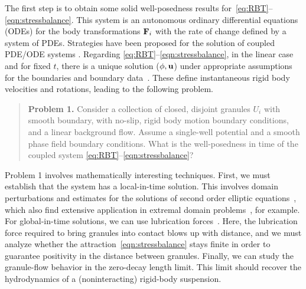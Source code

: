 The first step is to obtain some solid well-posedness results
for~\eqref{eq:RBT}--\eqref{eqn:stressbalance}.
This system is an
autonomous ordinary differential equations (ODEs) for the body transformations
$\mathbf{F}_i$ with the rate of change defined by a system of PDEs.
Strategies have been proposed for the solution of
coupled PDE/ODE systems 
\cite{Carichino2018EnergybasedOS,Quarteroni2016GeometricMM}.
Regarding \eqref{eq:RBT}--\eqref{eqn:stressbalance},
in the linear case and for fixed $t$, there is a unique
solution ($\phi, \mathbf{u}$) under appropriate assumptions for the boundaries
and boundary data~\cite{manasthesis, rac-gre2016, LAX}. These define
instantaneous rigid body velocities and rotations, leading to the
following problem.
\begin{quotation}
  \noindent
  \textbf{Problem 1.} 
  Consider a collection of closed, disjoint granules $U_i$ with smooth
  boundary, with no-slip, rigid body motion boundary conditions, and a
  linear background flow. Assume a single-well potential and a smooth
  phase field boundary conditions. What is the well-posedness in time of
  the coupled system \eqref{eq:RBT}--\eqref{eqn:stressbalance}?
\end{quotation}
Problem 1 involves mathematically interesting techniques. First, we must
establish that the system has a local-in-time solution. This involves
domain perturbations and estimates for the solutions of second order
elliptic equations~\cite{Savar2002DomainPA, DANERS20081,
Lamboley2015EstimatesOF}, which also find extensive application in
extremal domain problems~\cite{Schiffer1954VariationOD,
Henrot2006ExtremumPF, bogosel:hal-03607776,Bogosel2022OnTP}, for
example.
For global-in-time solutions, we can use lubrication
forces~\cite{cawthorn_balmforth_2010, leal_2007}. Here, the lubrication
force required to bring granules into contact blows up with distance,
and we must analyze whether the attraction~\eqref{eqn:stressbalance}
stays finite in order to guarantee positivity in the distance between
granules.
Finally, we can study the granule-flow behavior in the
zero-decay length limit. This limit should recover the hydrodynamics of
a (noninteracting) rigid-body suspension.

